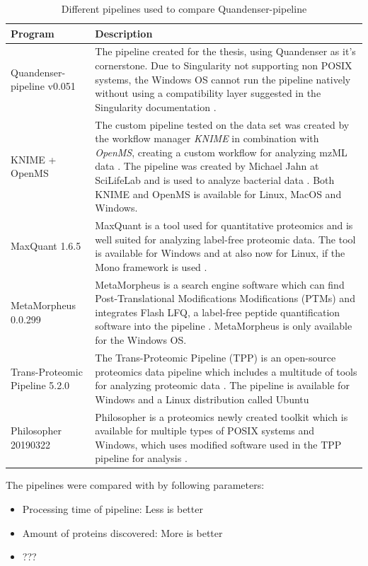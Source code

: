 \newcommand{\textone}{\small The pipeline created for the thesis, using Quandenser as it's cornerstone. Due to Singularity not supporting non POSIX systems, the Windows OS cannot run the pipeline natively without using a compatibility layer suggested in the Singularity documentation \cite{singularity-documentation}.}
\newcommand{\texttwo}{\small The custom pipeline tested on the data set was created by the workflow manager \textit{KNIME} in combination with \textit{OpenMS}, creating a custom workflow for analyzing mzML data \cite{knime} \cite{openms}. The pipeline was created by Michael Jahn at SciLifeLab and is used to analyze bacterial data \cite{m-jahn-pipeline}. Both KNIME and OpenMS is available for Linux, MacOS and Windows.}
\newcommand{\textthree}{\small MaxQuant is a tool used for quantitative proteomics and is well suited for analyzing label-free proteomic data. The tool is available for Windows and at also now for Linux, if the Mono framework is used \cite{maxquant} \cite{maxquant-installation}.}
\newcommand{\textfour}{\small MetaMorpheus is a search engine software which can find Post-Translational Modifications Modifications (PTMs) and integrates Flash LFQ, a label-free peptide quantification software into the pipeline \cite{metamorpheus}. MetaMorpheus is only available for the Windows OS.}
\newcommand{\textfive}{\small The Trans-Proteomic Pipeline (TPP) is an open-source proteomics data pipeline which includes a multitude of tools for analyzing proteomic data \cite{TPP}. The pipeline is available for Windows and a Linux distribution called Ubuntu}
\newcommand{\textsix}{\small Philosopher is a proteomics newly created toolkit which is available for multiple types of POSIX systems and Windows, which uses modified software used in the TPP pipeline for analysis \cite{philosopher}.}

\begin{table}[H]
\begin{tabular}{|p{4cm}|p{9cm}|}
\hline
Program & Description \\ \hline \hline
Quandenser-pipeline v0.051 & \textone \\ \hline
KNIME + OpenMS & \texttwo \\ \hline
MaxQuant 1.6.5 & \textthree \\ \hline
MetaMorpheus 0.0.299 & \textfour \\ \hline
Trans-Proteomic Pipeline 5.2.0 & \textfive \\ \hline
Philosopher 20190322 & \textsix \\ \hline
\end{tabular}
\caption{Different pipelines used to compare Quandenser-pipeline}
\end{table}

The pipelines were compared with by following parameters:

\begin{itemize}
  \item Processing time of pipeline: Less is better
  \item Amount of proteins discovered: More is better
  \item ???
\end{itemize}
